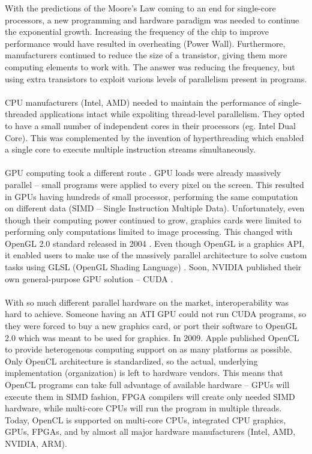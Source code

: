 With the predictions of the Moore's Law \cite{moore1965cramming} coming to an end for single-core processors, a new programming and hardware paradigm was needed to continue the exponential growth. Increasing the frequency of the chip to improve performance would have resulted in overheating (Power Wall). Furthermore, manufacturers continued to reduce the size of a transistor, giving them more computing elements to work with. The answer was reducing the frequency, but using extra transistors to exploit various levels of parallelism present in programs.\\
\\
CPU manufacturers (Intel, AMD) needed to maintain the performance of single-threaded applications intact while expoliting thread-level parallelism. They opted to have a small number of independent cores in their processors (eg. Intel Dual Core). This was complemented by the invention of hyperthreading \cite{marr2002hyper} which enabled a single core to execute multiple instruction streams simultaneously.\\
\\
GPU computing took a different route \cite{mcclanahan2010history}. GPU loads were already massively parallel -- small programs were applied to every pixel on the screen. This resulted in GPUs having hundreds of small processor, performing the same computation on different data (SIMD -- Single Instruction Multiple Data). Unfortunately, even though their computing power continued to grow, graphics cards were limited to performing only computations limited to image processing. This changed with OpenGL 2.0 standard released in 2004 \cite{segal2004opengl}. Even though OpenGL is a graphics API, it enabled users to make use of the massively parallel architecture to solve custom tasks using GLSL (OpenGL Shading Language) \cite{kessenich2004opengl}. Soon, NVIDIA published their own general-purpose GPU solution -- CUDA \cite{nvidia2007nvidia}.\\
\\
With so much different parallel hardware on the market, interoperability was hard to achieve. Someone having an ATI GPU could not run CUDA programs, so they were forced to buy a new graphics card, or port their software to OpenGL 2.0 which was meant to be used for graphics. In 2009. Apple published OpenCL \cite{munshi2009opencl} to provide heterogenous computing support on as many platforms as possible. Only OpenCL architecture is standardized, so the actual, underlying implementation (organization) is left to hardware vendors. This means that OpenCL programs can take full advantage of available hardware -- GPUs will execute them in SIMD fashion, FPGA compilers will create only needed SIMD hardware, while multi-core CPUs will run the program in multiple threads. Today, OpenCL is supported on multi-core CPUs, integrated CPU graphics, GPUs, FPGAs, and by almost all major hardware manufacturers (Intel, AMD, NVIDIA, ARM).


